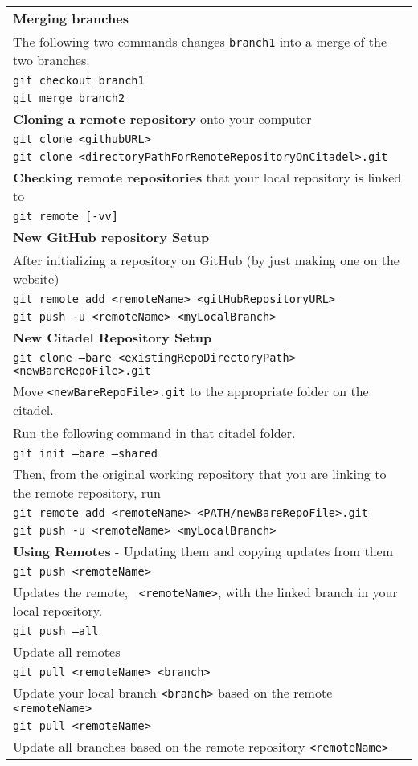 \documentclass[11pt]{article}
\newcommand{\smallbold}[1]{\footnotesize\textbf{#1}}
\begin{document}
{\begin{center}
\begin{tabular}{|l|}
\hline
\smallbold{Merging branches}\\  The following two commands changes \texttt{branch1} into a merge of the two branches. \\
\quad \texttt{git checkout branch1}\\
\quad \texttt{git merge branch2}\\

\hline
\smallbold{Cloning a remote repository} onto your computer\\
\quad \texttt{git clone <githubURL>}\\

\quad \texttt{git clone <directoryPathForRemoteRepositoryOnCitadel>.git}\\

\hline
\smallbold{Checking remote repositories} that your local repository is linked to\\
\quad \texttt{git remote [-vv]}\\

\hline
\smallbold{New GitHub repository Setup}\\
After initializing a repository on GitHub (by just making one on the website)\\
\quad \texttt{git remote add <remoteName> <gitHubRepositoryURL>}\\
\quad \texttt{git push -u <remoteName> <myLocalBranch>}\\
\hline
\smallbold{New Citadel Repository Setup}\\
\quad \texttt{git clone --bare <existingRepoDirectoryPath> <newBareRepoFile>.git}\\
Move \texttt{<newBareRepoFile>.git} to the appropriate folder on the citadel.\\  
Run the following command in that citadel folder.\\
\quad \texttt{git init --bare --shared}\\
Then, from the original working repository that you are linking to the remote repository, run\\
\quad \texttt{git remote add <remoteName> <PATH/newBareRepoFile>.git}\\
\quad \texttt{git push -u <remoteName> <myLocalBranch>}\\

\hline
\smallbold{Using Remotes} - Updating them and copying updates from them\\
\quad \texttt{git push <remoteName>}\\
\quad\quad Updates the remote, \texttt{ <remoteName>}, with the linked branch in your local repository.\\
\quad \texttt{git push --all}\\
\quad \quad Update all remotes\\
\quad \texttt{git pull <remoteName> <branch>}\\
\quad \quad Update your local branch \texttt{<branch>} based on the remote \texttt{<remoteName>}\\
\quad \texttt{git pull <remoteName>}\\
\quad \quad Update all branches based on the remote repository \texttt{<remoteName>}\\


\end{tabular}
\end{center}}
\end{document}
